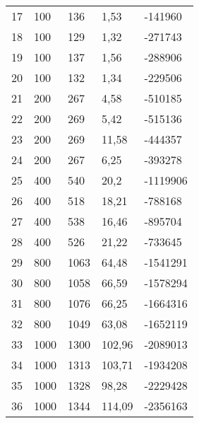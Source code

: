 \begin{longtable}{lllll}
    17               & 100            & 136            & 1,53        & -141960         \\
    18               & 100            & 129            & 1,32        & -271743         \\
    19               & 100            & 137            & 1,56        & -288906         \\
    20               & 100            & 132            & 1,34        & -229506         \\
    21               & 200            & 267            & 4,58        & -510185         \\
    22               & 200            & 269            & 5,42        & -515136         \\
    23               & 200            & 269            & 11,58       & -444357         \\
    24               & 200            & 267            & 6,25        & -393278         \\
    25               & 400            & 540            & 20,2        & -1119906        \\
    26               & 400            & 518            & 18,21       & -788168         \\
    27               & 400            & 538            & 16,46       & -895704         \\
    28               & 400            & 526            & 21,22       & -733645         \\
    29               & 800            & 1063           & 64,48       & -1541291        \\
    30               & 800            & 1058           & 66,59       & -1578294        \\
    31               & 800            & 1076           & 66,25       & -1664316        \\
    32               & 800            & 1049           & 63,08       & -1652119        \\
    33               & 1000           & 1300           & 102,96      & -2089013        \\
    34               & 1000           & 1313           & 103,71      & -1934208        \\
    35               & 1000           & 1328           & 98,28       & -2229428        \\
    36               & 1000           & 1344           & 114,09      & -2356163        \\

\end{longtable}
